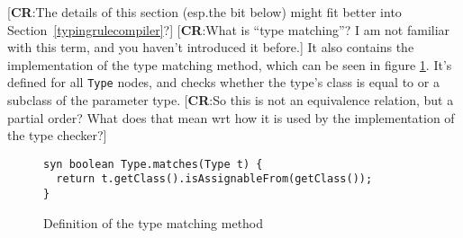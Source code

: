 \documentclass[nofilelist]{cslthse-msc}
\newcommand{\CR}[1]{\textcolor{green!60!black}{[\textbf{CR}:#1]}}
\begin{document}
\CR{The details of this section (esp.\@ the bit below) might fit better into Section~\ref{typingrulecompiler}?}
\CR{What is ``type matching''?  I am not familiar with this term, and you haven't introduced it before.}
It also contains the implementation of the type matching method, which can be seen in figure \ref{typematches}.
It's defined for all \lstinline{Type} nodes, and checks whether the type's class is equal to or a subclass of the parameter type.
\CR{So this is not an equivalence relation, but a partial order?  What does that mean wrt how it is used by the implementation of the type checker?}

\begin{figure}[h]
  \begin{lstlisting}[language=jrag]
syn boolean Type.matches(Type t) {
  return t.getClass().isAssignableFrom(getClass());
}
  \end{lstlisting}
  \caption{Definition of the type matching method}
  \label{typematches}
\end{figure}





\end{document}

